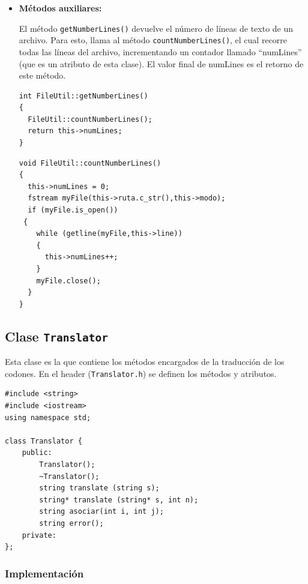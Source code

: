 \begin{itemize}
\item \textbf{Métodos auxiliares:}

El método \texttt{getNumberLines()} devuelve el número de líneas de texto de un archivo. Para esto, llama al método \texttt{countNumberLines()}, el cual recorre todas las líneas del archivo, incrementando un contador llamado ``numLines'' (que es un atributo de esta clase). El valor final de numLines es el retorno de este método.

\begin{verbatim}
int FileUtil::getNumberLines()
{
  FileUtil::countNumberLines();
  return this->numLines;
}
\end{verbatim}


\begin{verbatim}
void FileUtil::countNumberLines()
{
  this->numLines = 0;
  fstream myFile(this->ruta.c_str(),this->modo);
  if (myFile.is_open())
 {
    while (getline(myFile,this->line))
    {
      this->numLines++;
    }
    myFile.close();
  }
}

\end{verbatim}

\end{itemize}
\subsection{Clase \texttt{Translator}}

Esta clase es la que contiene los métodos encargados de la traducción de los codones. En el header (\texttt{Translator.h}) se definen los métodos y atributos.
\begin{verbatim}
#include <string>
#include <iostream>
using namespace std;

class Translator {
	public:
    	Translator();
    	~Translator();
    	string translate (string s);
    	string* translate (string* s, int n);
    	string asociar(int i, int j);
    	string error();
    private:
};
\end{verbatim}

\subsubsection{Implementación}

